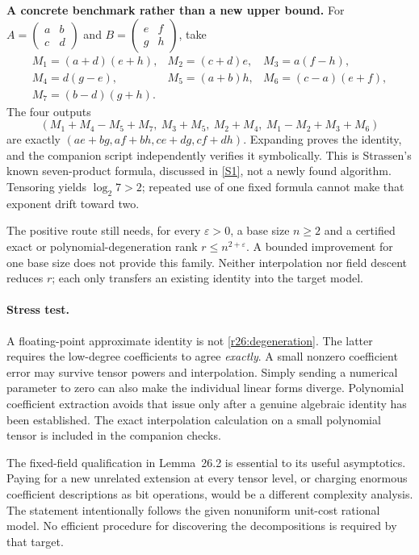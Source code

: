 \documentclass[11pt,a4paper]{article}
\newcommand{\sref}[2]{\hyperlink{source:#1:#2}{[S#2]}}
\numberwithin{equation}{section}
\begin{document}
\medskip
\textbf{A concrete benchmark rather than a new upper bound.}
For
$A=\left(\begin{smallmatrix}a&b\\c&d\end{smallmatrix}\right)$ and
$B=\left(\begin{smallmatrix}e&f\\g&h\end{smallmatrix}\right)$, take
\[
\begin{array}{lll}
 M_1=(a+d)(e+h),&M_2=(c+d)e,&M_3=a(f-h),\\
 M_4=d(g-e),&M_5=(a+b)h,&M_6=(c-a)(e+f),\\
 M_7=(b-d)(g+h).&&
\end{array}
\]
The four outputs
\[
 (M_1+M_4-M_5+M_7,\ M_3+M_5,\ M_2+M_4,\ M_1-M_2+M_3+M_6)
\]
are exactly $(ae+bg,af+bh,ce+dg,cf+dh)$. Expanding proves the identity,
and the companion script independently verifies it symbolically. This
is Strassen's known seven-product formula, discussed in \sref{26}{1},
not a newly found algorithm. Tensoring yields $\log_2 7>2$; repeated
use of one fixed formula cannot make that exponent drift toward two.

The positive route still needs, for every $\varepsilon>0$, a base size
$n\ge2$ and a certified exact or polynomial-degeneration rank
$r\le n^{2+\varepsilon}$. A bounded improvement for one base size does
not provide this family. Neither interpolation nor field descent reduces
$r$; each only transfers an existing identity into the target model.

\paragraph{Stress test.}
A floating-point approximate identity is not
\eqref{r26:degeneration}. The latter requires the low-degree coefficients
to agree \emph{exactly}. A small nonzero coefficient error may survive
tensor powers and interpolation. Simply sending a numerical parameter
to zero can also make the individual linear forms diverge. Polynomial
coefficient extraction avoids that issue only after a genuine algebraic
identity has been established. The exact interpolation calculation on
a small polynomial tensor is included in the companion checks.

The fixed-field qualification in Lemma~26.2 is essential to its useful
asymptotics. Paying for a new unrelated extension at every tensor level,
or charging enormous coefficient descriptions as bit operations, would
be a different complexity analysis. The statement intentionally follows
the given nonuniform unit-cost rational model. No efficient procedure
for discovering the decompositions is required by that target.
\end{document}
